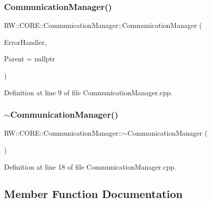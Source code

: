 \subsubsection{\texorpdfstring{Communication\+Manager()}{CommunicationManager()}}
{\footnotesize\ttfamily R\+W\+::\+C\+O\+R\+E\+::\+Communication\+Manager\+::\+Communication\+Manager (\begin{DoxyParamCaption}\item[{\hyperlink{class_r_w_1_1_c_o_r_e_1_1_error_handler}{Error\+Handler} $\ast$}]{Error\+Handler,  }\item[{Q\+Object $\ast$}]{Parent = {\ttfamily nullptr} }\end{DoxyParamCaption})}



Definition at line 9 of file Communication\+Manager.\+cpp.

\hypertarget{class_r_w_1_1_c_o_r_e_1_1_communication_manager_a4fc7eed7b4e58d01100820e21eb19f57}{}\label{class_r_w_1_1_c_o_r_e_1_1_communication_manager_a4fc7eed7b4e58d01100820e21eb19f57} 
\subsubsection{\texorpdfstring{$\sim$\+Communication\+Manager()}{~CommunicationManager()}}
{\footnotesize\ttfamily R\+W\+::\+C\+O\+R\+E\+::\+Communication\+Manager\+::$\sim$\+Communication\+Manager (\begin{DoxyParamCaption}{ }\end{DoxyParamCaption})}



Definition at line 18 of file Communication\+Manager.\+cpp.



\subsection{Member Function Documentation}
\hypertarget{class_r_w_1_1_c_o_r_e_1_1_communication_manager_a496af2c201ed48e14033b640cf78ed3f}{}\label{class_r_w_1_1_c_o_r_e_1_1_communication_manager_a496af2c201ed48e14033b640cf78ed3f} 
